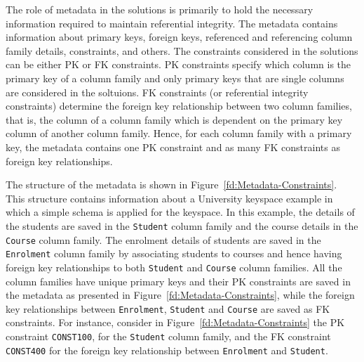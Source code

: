 The role of metadata in  the solutions is primarily to hold the necessary
 information required to maintain referential integrity. The metadata contains  
 information about primary keys,   foreign keys,  referenced and referencing
 column family details, constraints, and others.  The constraints considered in
 the solutions can be either \ac{PK} or \ac{FK}
constraints. \ac{PK} constraints specify which column is the primary key of a
column family and only primary keys that are single columns are considered in
the soltuions. \ac{FK} constraints (or referential integrity constraints)
determine the foreign key relationship between two column families, that is, the
 column of a column family which  is dependent on the primary key  column of
 another column family.  Hence, for each column family with a primary key,  the
metadata  contains one \ac{PK} constraint  and  as
many \ac{FK} constraints as foreign key relationships. 

The structure of the metadata is shown in
Figure~\ref{fd:Metadata-Constraints}.  This structure contains information about a
University keyspace example in which  a simple schema is applied for the
keyspace. In this example,  the details of the students are saved in  the
\texttt{Student} column family and the course
 details in the \texttt{Course} column family.
 The enrolment details of students are saved in the 
\texttt{Enrolment} column family by associating students to courses and
hence having foreign key relationships to both \texttt{Student} and
\texttt{Course} column families.
All the column families have unique primary keys and their \ac{PK} constraints are saved in
the metadata as presented in Figure~\ref{fd:Metadata-Constraints}, while the
foreign key relationships between \texttt{Enrolment}, \texttt{Student} and
\texttt{Course} are saved as \ac{FK} constraints.  For instance, consider in
 Figure~\ref{fd:Metadata-Constraints} the \ac{PK} constraint \texttt{CONST100},
 for the \texttt{Student} column family, and the \ac{FK} constraint  
 \texttt{CONST400} for the foreign key relationship between
\texttt{Enrolment} and \texttt{Student}.

